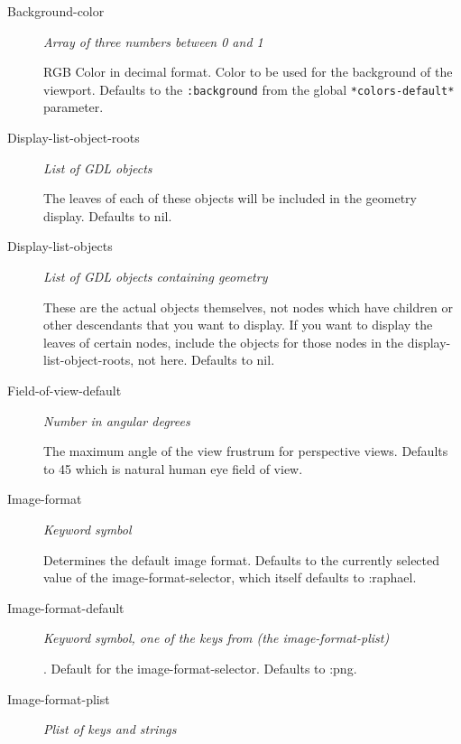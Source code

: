\documentclass [11pt]{book}
\begin{document}
\begin{itemize}
\begin{description}
\item [Background-color]
\emph{Array of three numbers between 0 and 1}

 RGB Color in decimal
format. Color to be used for the background of the viewport.
Defaults to the
\texttt{:background} from the global \texttt{*colors-default*} parameter.




\item [Display-list-object-roots]
\emph{List of GDL objects}

 The leaves of each of these objects will
be included in the geometry display. Defaults to nil.




\item [Display-list-objects]
\emph{List of GDL objects containing geometry}

 These are the
actual objects themselves, not nodes which have children or
other descendants that you want to display. If you want to
display the leaves of certain nodes, include the objects for
those nodes in the display-list-object-roots, not here.
Defaults to nil.




\item [Field-of-view-default]
\emph{Number in angular degrees}

 The maximum angle of the view frustrum
for perspective views. Defaults to 45 which is natural human eye field of view.




\item [Image-format]
\emph{Keyword symbol}

 Determines the default image format. Defaults to the currently selected
value of the image-format-selector, which itself defaults to :raphael.




\item [Image-format-default]
\emph{Keyword symbol, one of the keys from (the image-format-plist)}

.
Default for the image-format-selector. Defaults to :png.




\item [Image-format-plist]
\emph{Plist of keys and strings}


\end{description}
\end{itemize}
\end{document}

